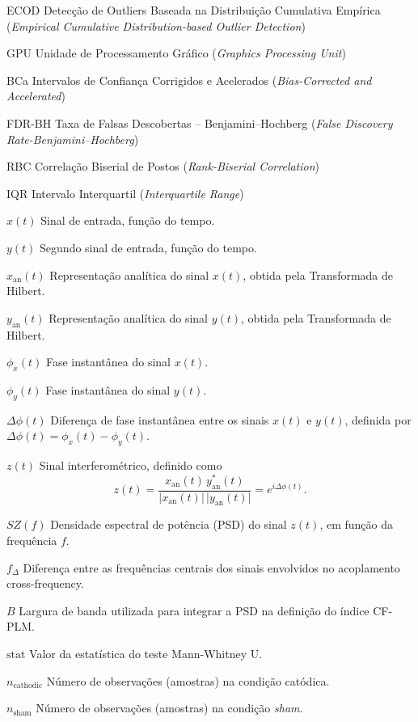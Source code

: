 \documentclass[
  12pt,
  openany,
  twoside,
  a4paper,
  english,
  brazil
]{abntex2}
\begin{document}
\begin{siglas}
  \item[ECOD] Detecção de Outliers Baseada na Distribuição Cumulativa Empírica (\textit{Empirical Cumulative Distribution-based Outlier Detection})
  \item[GPU] Unidade de Processamento Gráfico (\textit{Graphics Processing Unit})
  \item[BCa] Intervalos de Confiança Corrigidos e Acelerados (\textit{Bias-Corrected and Accelerated})
  \item[FDR-BH] Taxa de Falsas Descobertas – Benjamini–Hochberg (\textit{False Discovery Rate-Benjamini–Hochberg})
  \item[RBC] Correlação Biserial de Postos (\textit{Rank-Biserial Correlation})
  \item[IQR] Intervalo Interquartil (\textit{Interquartile Range})
\end{siglas}


\begin{simbolos}
  \item[$x(t)$] Sinal de entrada, função do tempo.
  \item[$y(t)$] Segundo sinal de entrada, função do tempo.
  \item[$x_{\mathrm{an}}(t)$] Representação analítica do sinal \(x(t)\), obtida pela Transformada de Hilbert.
  \item[$y_{\mathrm{an}}(t)$] Representação analítica do sinal \(y(t)\), obtida pela Transformada de Hilbert.
  \item[$\phi_x(t)$] Fase instantânea do sinal \(x(t)\).
  \item[$\phi_y(t)$] Fase instantânea do sinal \(y(t)\).
  \item[$\Delta \phi(t)$] Diferença de fase instantânea entre os sinais \(x(t)\) e \(y(t)\), definida por \(\Delta \phi(t) = \phi_x(t)-\phi_y(t)\).
  \item[$z(t)$] Sinal interferométrico, definido como 
  \[
  z(t)=\frac{x_{\mathrm{an}}(t)\, y_{\mathrm{an}}^*(t)}{\lvert x_{\mathrm{an}}(t)\rvert\, \lvert y_{\mathrm{an}}(t)\rvert} = e^{i\Delta \phi(t)}.
  \]
  \item[$SZ(f)$] Densidade espectral de potência (PSD) do sinal \(z(t)\), em função da frequência \(f\).
  \item[$f_\Delta$] Diferença entre as frequências centrais dos sinais envolvidos no acoplamento cross-frequency.
  \item[$B$] Largura de banda utilizada para integrar a PSD na definição do índice CF-PLM.
  \item[$\text{stat}$] Valor da estatística do teste Mann-Whitney U.
  \item[$n_{\text{cathodic}}$] Número de observações (amostras) na condição catódica.
  \item[$n_{\text{sham}}$] Número de observações (amostras) na condição \textit{sham}.
\end{simbolos}
\end{document}
